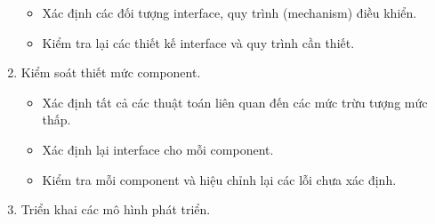 \documentclass[./../SoftwareEngineering.tex]{subfiles}
\begin{document}
\begin{multicols}{2}
\begin{enumerate}
\begin{itemize}
				\item Xác định các đối tượng interface, quy trình (mechanism) điều khiển.
				
				\item Kiểm tra lại các thiết kế interface và quy trình cần thiết.
			\end{itemize}
			
			
			
			\item Kiểm soát thiết mức component.
			\begin{itemize}
				\setlength\itemsep{0em}
				\item Xác định tất cả các thuật toán liên quan đến các mức trừu tượng mức thấp.
				
				\item Xác định lại interface cho mỗi component.
				
				\item Kiểm tra mỗi component và hiệu chỉnh lại các lỗi chưa xác định.
			\end{itemize}
			
			\item Triển khai các mô hình phát triển.
		\end{enumerate}	
	\end{multicols}
\end{document}
